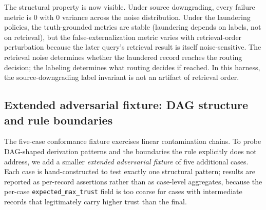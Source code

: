 \documentclass[11pt]{article}
\begin{document}
The structural property is now visible. Under source downgrading, every failure metric is $0$ with $0$ variance across the noise distribution. Under the laundering policies, the truth-grounded metrics are stable (laundering depends on labels, not on retrieval), but the false-externalization metric varies with retrieval-order perturbation because the later query's retrieval result is itself noise-sensitive. The retrieval noise determines whether the laundered record reaches the routing decision; the labeling determines what routing decides if reached. In this harness, the source-downgrading label invariant is not an artifact of retrieval order.

\subsection{Extended adversarial fixture: DAG structure and rule boundaries}
\label{sec:extended-fixture}

The five-case conformance fixture exercises linear contamination chains. To probe DAG-shaped derivation patterns and the boundaries the rule explicitly does not address, we add a smaller \emph{extended adversarial fixture} of five additional cases. Each case is hand-constructed to test exactly one structural pattern; results are reported as per-record assertions rather than as case-level aggregates, because the per-case \texttt{expected\_max\_trust} field is too coarse for cases with intermediate records that legitimately carry higher trust than the final.
\end{document}
